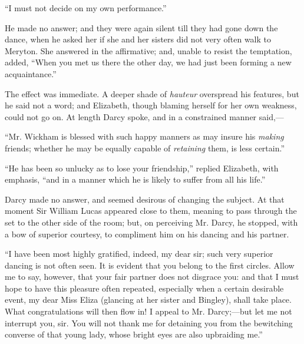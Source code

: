 ``I must not decide on my own performance.''

He made no answer; and they were again silent till they had gone down the dance, when he asked her if she and her sisters did not very often walk to Meryton. She answered in the affirmative; and, unable to resist the temptation, added, ``When you met us there the other day, we had just been forming a new acquaintance.''

The effect was immediate. A deeper shade of \textit{hauteur} overspread his features, but he said not a word; and Elizabeth, though blaming herself for her own weakness, could not go on. At length Darcy spoke, and in a constrained manner said,---

``Mr. Wickham is blessed with such happy manners as may insure his \textit{making} friends; whether he may be equally capable of \textit{retaining} them, is less certain.''

``He has been so unlucky as to lose your friendship,'' replied Elizabeth, with emphasis, ``and in a manner which he is likely to suffer from all his life.''

Darcy made no answer, and seemed desirous of changing the subject. At that moment Sir William Lucas appeared close to them, meaning to pass through the set to the other side of the room; but, on perceiving Mr. Darcy, he stopped, with a bow of superior courtesy, to compliment him on his dancing and his partner.

``I have been most highly gratified, indeed, my dear sir; such very superior dancing is not often seen. It is evident that you belong to the first circles. Allow me to say, however, that your fair partner does not disgrace you: and that I must hope to have this pleasure often repeated, especially when a certain desirable event, my dear Miss Eliza (glancing at her sister and Bingley), shall take place. What congratulations will then flow in! I appeal to Mr. Darcy;---but let me not interrupt you, sir. You will not thank me for detaining you from the bewitching converse of that young lady, whose bright eyes are also upbraiding me.''

